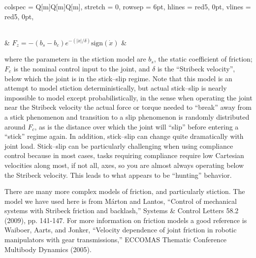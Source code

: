 \documentclass[]{article}
\begin{document}
\begin{tblr}{
  colspec = {Q[m]Q[m]Q[m]},
  stretch = 0,
  rowsep = 6pt,
  hlines = {red5, 0pt},
  vlines = {red5, 0pt},
}
{}
 	\\
	& $F_{z} = -(b_{s}-b_{c})e^{-(|\dot{x}|/\delta)}\text{sign}(\dot{x})  $ & \\
\end{tblr}
\vspace{0.5cm}

\noindent
where the parameters in the stiction model are $b_{s}$, the static coefficient of friction; $F_{c}$ is the nominal control input to the joint, and $\delta$ is the ``Stribeck velocity'', below which the joint is in the stick--slip regime. Note that this model is an attempt to model stiction deterministically, but actual stick--slip is nearly impossible to model except probabilistically, in the sense when operating the joint near the Stribeck velocity the actual force or torque needed to ``break'' away from a stick phenomenon and transition to a slip phenomenon is randomly distributed around $F_{c}$, as is the distance over which the joint will ``slip'' before entering a ``stick'' regime again. In addition, stick--slip can change quite dramatically with joint load. Stick--slip can be particularly challenging when using compliance control because in most cases, tasks requiring compliance require low Cartesian velocities along most, if not all, axes, so you are almost always operating below the Stribeck velocity. This leads to what appears to be ``hunting'' behavior.

There are many more complex models of friction, and particularly stiction. The model we have used here is from Márton and Lantos, ``Control of mechanical systems with Stribeck friction and backlash,'' Systems \& Control Letters 58.2 (2009), pp. 141-147. For more information on friction models a good reference is Waiboer, Aarts, and Jonker, ``Velocity dependence of joint friction in robotic manipulators with gear transmissions,'' ECCOMAS Thematic Conference Multibody Dynamics (2005).
\end{document}
